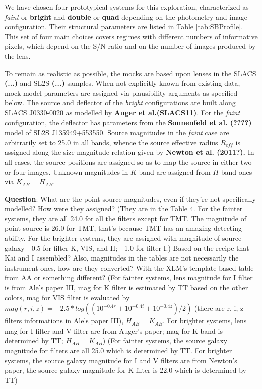 \documentclass[a4paper,11pt]{article}
\begin{document}
We have chosen four prototypical systems for this exploration, characterized as \textit{faint} or \textbf{bright} and \textbf{double} or \textbf{quad} depending on the photometry and image configuration. Their structural parameters are listed in Table \ref{tab:SBProfile}. This set of four main choices covers regimes with different numbers of informative pixels, which depend on the S/N ratio and on the number of images produced by the lens.

To remain as realistic as possible, the mocks are based upon lenses in the SLACS \textbf{(...)} and SL2S \textbf{(...)} samples. When not explicitly known from existing data, mock model parameters are assigned via plausibility arguments as specified below. The source and deflector of the \textit{bright} configurations are built along SLACS J0330-0020 as modelled by \textbf{Auger et al.(SLACS11)}. For the \textit{faint} configuration, the deflector has parameters from the \textbf{Sonnenfeld et al. (????)} model of SL2S J135949+553550.
 Source magnitudes in the \textit{faint} case are arbitrarily set to 25.0 in all bands, whence the source effective radius $R_{eff}$ is assigned along the size-magnitude relation given by \textbf{Newton et al. (2011?).} In all cases, the source positions are assigned so as to map the source in either two or four images. Unknown magnitudes in $K$ band are assigned from $H$-band ones via $K_{AB}=H_{AB}.$
 
\textbf{Question}: What are the point-source magnitudes, even if they're not specifically modelled? How were they assigned? (They are in the Table 4. For the fainter systems, they are all 24.0 for all the filters except for TMT. The magnitude of point source is 26.0 for TMT, that's because TMT has an amazing detecting ability. For the brighter systems, they are assigned with magnitude of source galaxy - 0.5 for filter K, VIS, and H; - 1.0 for filter I.)
 Based on the recipe that Kai and I assembled? Also, magnitudes in the tables are not necessarily the instrument ones, how are they converted? With the XLM's template-based table from AA or something different? (For fainter systems, lens magnitude for I filter is from Ale's paper III, mag for K filter is estimated by TT based on the other colors, mag for VIS filter is evaluated by $mag(r,i,z)=-2.5*log((10^{-0.4r}+10^{-0.4i}+10^{-0.4z})/2)$ (there are r, i, z filters informations in Ale's paper III), $H_{AB}=K_{AB}$. For brighter systems, lens mag for I filter and V filter are from Auger's paper; mag for K band is determined by TT;  $H_{AB}=K_{AB}$) (For fainter systems, the source galaxy magnitude for filters are all 25.0 which is determined by TT. For brighter systems, the source galaxy magnitude for I and V filters are from Newton's paper, the source galaxy magnitude for K filter is 22.0 which is determined by TT)
\end{document}

